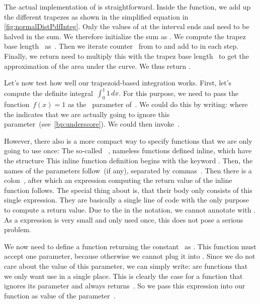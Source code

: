 The actual implementation of  is straightforward.
Inside the function, we add up the different trapezes as shown in the simplified equation in \cref{fig:normalDistPdfInteg}.
Only the values of  at the interval ends  and  need to be halved in the sum.
We therefore initialize the sum  as .
We compute the trapez base length~ as~.
Then we iterate counter~ from  to  and add  to  in each step.
Finally, we return need to multiply this with the trapez base length~ to get the approximation of the area under the curve.
We thus return .

Let's now test how well our trapezoid-based integration works.
First, let's compute the definite integral~$\int_0^1 1\,dx$.
For this purpose, we need to pass the function~$f(x)=1$ as the~ parameter of~.
We could do this by writing:%
%
%
%
where the \pythonil{_}\pythonIdx{\_} indicates that we are actually going to ignore this parameter~(see~\cref{bp:underscore}).
We could then invoke~.

However, there also is a more compact way to specify functions that we are only going to use once:
The so-called ~\cite{PSF:P3D:TPLR:L}, nameless functions defined inline, which have the structure%
%
%
%
This inline function definition begins with the keyword .
Then, the names of the parameters follow~(if any), separated by commas~\pythonil{,}.
Then there is a colon~\pythonil{:}, after which an expression computing the return value of the inline function follows.
The special thing about  is, that their body only consists of this single expression.
They are basically a single line of code with the only purpose to compute a return value.
Due to the \pythonilIdx{:} in the notation, we cannot annotate  with .
As a  expression is very small and only used once, this does not pose a serious problem.

We now need to define a function returning the constant~ as .
This function must accept one parameter, because otherwise we cannot plug it into .
Since we do not care about the value of this parameter, we can simply write:%
%
%
%
 are functions that we only want use in a single place.
This is clearly the case for a function that ignores its parameter and always returns~.
So we pass this expression into our  function as value of the parameter~.

